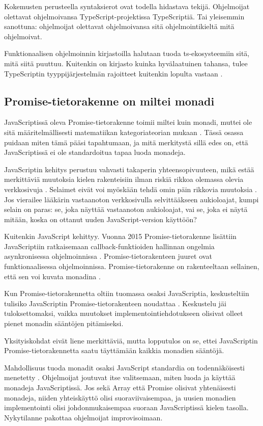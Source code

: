 Kokemusten perusteella syntaksierot ovat todella hidastava tekijä. Ohjelmoijat olettavat ohjelmoivansa TypeScript-projektissa TypeScriptiä. Tai yleisemmin sanottuna: ohjelmoijat olettavat ohjelmoivansa sitä ohjelmointikieltä mitä ohjelmoivat.

Funktionaalisen ohjelmoinnin kirjastoilla halutaan tuoda \gls{ts}-ekosysteemiin sitä, mitä siitä puuttuu. Kuitenkin on kirjasto kuinka hyvälaatuinen tahansa, tulee TypeScriptin tyyppijärjestelmän rajoitteet kuitenkin lopulta vastaan \cite{holvikari2021category}.

\subsection{Promise-tietorakenne on miltei monadi}

JavaScriptissä oleva Promise-tietorakenne toimii miltei kuin monadi, muttei ole sitä määritelmällisesti matematiikan kategoriateorian mukaan \cite{stackoverflow:why_monad,promises-spec-94}. Tässä osassa puidaan miten tämä pääsi tapahtumaan, ja mitä merkitystä sillä edes on, että JavaScriptissä ei ole standardoitua tapaa luoda monadeja.

JavaScriptin kehitys perustuu vahvasti takaperin yhteensopivuuteen, mikä estää merkittäviä muutoksia kielen rakenteisiin ilman riskiä rikkoa olemassa olevia verkkosivuja \cite{prototype_library_trends}. Selaimet eivät voi myöskään tehdä omin päin rikkovia muutoksia \cite{against_self_closing_tags,proposal-joint-iteration}. Jos vierailee lääkärin vastaanoton verkkosivulla selvittääkseen aukioloajat, kumpi selain on paras: se, joka näyttää vastaanoton aukioloajat, vai se, joka ei näytä mitään, koska on ottanut uuden JavaScript-version käyttöön?

Kuitenkin JavaScript kehittyy. Vuonna 2015 Promise-tietorakenne lisättiin JavaScriptiin ratkaisemaan callback-funktioiden hallinnan ongelmia asynkronisessa ohjelmoinnissa \cite{mdn_promise,callbackhell}. Promise-tietorakenteen juuret ovat funktionaalisessa ohjelmoinnissa. Promise-tietorakenne on rakenteeltaan sellainen, että sen voi kuvata monadina \cite{promises-spec-94,stackoverflow:why_monad}.

Kun Promise-tietorakennetta oltiin tuomassa osaksi JavaScriptia, keskusteltiin tulisiko JavaScriptin Promise-tietorakenteen noudattaa  \cite{promises-spec-94}. Keskustelu jäi tuloksettomaksi, vaikka muutokset implementointiehdotukseen olisivat olleet pienet monadin sääntöjen pitämiseksi.

Yksityiskohdat eivät liene merkittäviä, mutta lopputulos on se, ettei JavaScriptin Promise-tietorakennetta saatu täyttämään kaikkia monadien sääntöjä.

Mahdollisuus tuoda monadit osaksi JavaScript standardia on todennäköisesti menetetty \cite{proposal-joint-iteration,prototype_library_trends}. Ohjelmoijat joutuvat itse valitsemaan, miten luoda ja käyttää monadeja JavaScriptissä. Jos sekä Array että Promise olisivat yhtenäisesti monadeja, niiden yhteiskäyttö olisi suoraviivaisempaa, ja uusien monadien implementointi olisi johdonmukaisempaa suoraan JavaScriptissä kielen tasolla. Nykytilanne pakottaa ohjelmoijat improvisoimaan.
